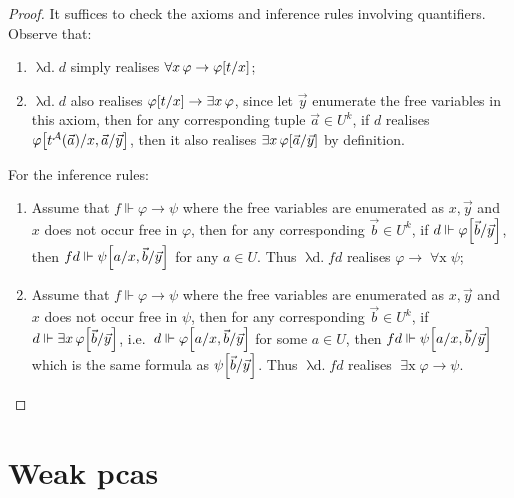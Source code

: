\documentclass[12pt,openany]{book}
\theoremstyle{plain}
\theoremstyle{definition}
\newcommand\uplabel[1]{\textup{(#1)}}
\newcommand\opA[1]{\mathop{\forall #1}}
\newcommand\opE[1]{\mathop{\exists #1}}
\newcommand\oplam[1]{\mathop{\lambda #1.}}
\begin{document}
\begin{proof}
  It suffices to check the axioms and inference rules involving quantifiers. Observe that:
  \begin{enumerate}[label=\uplabel{\arabic*},start=\intlogicproofquantcount]
    \item $\oplam{d} d$ simply realises $\opA{x} \varphi \rightarrow \varphi\mleft[t/x\mright]$;
    \item $\oplam{d} d$ also realises $\varphi\mleft[t/x\mright] \rightarrow \opE{x} \varphi$, since let $\vec{y}$ enumerate the free variables in this axiom, then for any corresponding tuple $\vec{a} \in U^k$, if $d$ realises $\varphi\mleft[t^\mathcal{A}\mleft(\vec{a}\mright)/x, \vec{a}/\vec{y}\mright]$, then it also realises $\opE{x} \varphi\mleft[\vec{a}/\vec{y}\mright]$ by definition.
  \end{enumerate}

  For the inference rules:
  \begin{enumerate}[label=\uplabel{\roman*},start=\intlogicrulesquantcount]
    \item Assume that $f \Vdash \varphi \rightarrow \psi$ where the free variables are enumerated as $x, \vec{y}$ and $x$ does not occur free in $\varphi$, then for any corresponding $\vec{b} \in U^k$, if $d \Vdash \varphi\mleft[\vec{b}/\vec{y}\mright]$, then $fd \Vdash \psi\mleft[a/x, \vec{b}/\vec{y}\mright]$ for any $a \in U$. Thus $\oplam{d} fd$ realises $\varphi \rightarrow \opA{x} \psi$;
    \item Assume that $f \Vdash \varphi \rightarrow \psi$ where the free variables are enumerated as $x, \vec{y}$ and $x$ does not occur free in $\psi$, then for any corresponding $\vec{b} \in U^k$, if $d \Vdash \opE{x} \varphi\mleft[\vec{b}/\vec{y}\mright]$, i.e.\ $d \Vdash \varphi\mleft[a/x, \vec{b}/\vec{y}\mright]$ for some $a \in U$, then $fd \Vdash \psi\mleft[a/x, \vec{b}/\vec{y}\mright]$ which is the same formula as $\psi\mleft[\vec{b}/\vec{y}\mright]$. Thus $\oplam{d} fd$ realises $\opE{x} \varphi \rightarrow \psi$. \qedhere
  \end{enumerate}
\end{proof}

\section{Weak pcas}
\end{document}
